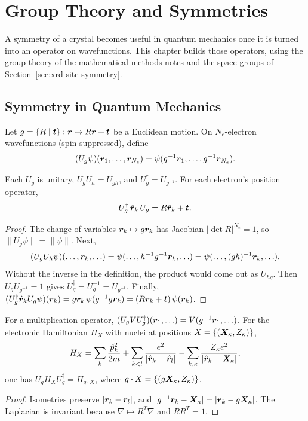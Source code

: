 \chapter{Group Theory and Symmetries}
\label{ch:ss-symmetry}

A symmetry of a crystal becomes useful in quantum mechanics once it is turned into an operator on wavefunctions. This chapter builds those operators, using the group theory of the mathematical-methods notes and the space groups of Section~\ref{sec:xrd-site-symmetry}.

\section{Symmetry in Quantum Mechanics}

Let $g = \{R\mid\bm{t}\}: \bm{r}\mapsto R\bm{r}+\bm{t}$ be a Euclidean motion. On $N_e$-electron wavefunctions (spin suppressed), define
\begin{equation}
    (U_g\psi)(\bm{r}_1,\ldots,\bm{r}_{N_e}) = \psi(g^{-1}\bm{r}_1,\ldots,g^{-1}\bm{r}_{N_e}).
\end{equation}

\begin{theorem}
Each $U_g$ is unitary, $U_gU_h = U_{gh}$, and $U_g^\dagger = U_{g^{-1}}$. For each electron's position operator,
\[
    U_g^\dagger\,\hat{\bm{r}}_k\,U_g = R\hat{\bm{r}}_k + \bm{t}.
\]
\end{theorem}
\begin{proof}
The change of variables $\bm{r}_k\mapsto g\bm{r}_k$ has Jacobian $|\det R|^{N_e} = 1$, so $\|U_g\psi\| = \|\psi\|$. Next,
\[
    (U_gU_h\psi)(\ldots,\bm{r}_k,\ldots) = \psi(\ldots,h^{-1}g^{-1}\bm{r}_k,\ldots) = \psi(\ldots,(gh)^{-1}\bm{r}_k,\ldots).
\]
Without the inverse in the definition, the product would come out as $U_{hg}$. Then $U_gU_{g^{-1}} = 1$ gives $U_g^\dagger = U_g^{-1} = U_{g^{-1}}$. Finally, $(U_g^\dagger\hat{\bm{r}}_kU_g\psi)(\bm{r}_k) = g\bm{r}_k\,\psi(g^{-1}g\bm{r}_k) = (R\bm{r}_k+\bm{t})\,\psi(\bm{r}_k)$.
\end{proof}

\begin{theorem}
For a multiplication operator, $(U_gVU_g^\dagger)(\bm{r}_1,\ldots) = V(g^{-1}\bm{r}_1,\ldots)$. For the electronic Hamiltonian $H_X$ with nuclei at positions $X = \{(\bm{X}_\kappa, Z_\kappa)\}$,
\[
    H_X = \sum_k\frac{\hat{p}_k^2}{2m} + \sum_{k<l}\frac{e^2}{|\hat{\bm{r}}_k-\hat{\bm{r}}_l|} - \sum_{k,\kappa}\frac{Z_\kappa e^2}{|\hat{\bm{r}}_k-\bm{X}_\kappa|},
\]
one has $U_gH_XU_g^\dagger = H_{g\cdot X}$, where $g\cdot X = \{(g\bm{X}_\kappa, Z_\kappa)\}$.
\end{theorem}
\begin{proof}
Isometries preserve $|\bm{r}_k-\bm{r}_l|$, and $|g^{-1}\bm{r}_k-\bm{X}_\kappa| = |\bm{r}_k - g\bm{X}_\kappa|$. The Laplacian is invariant because $\nabla\mapsto R^T\nabla$ and $RR^T = 1$.
\end{proof}

